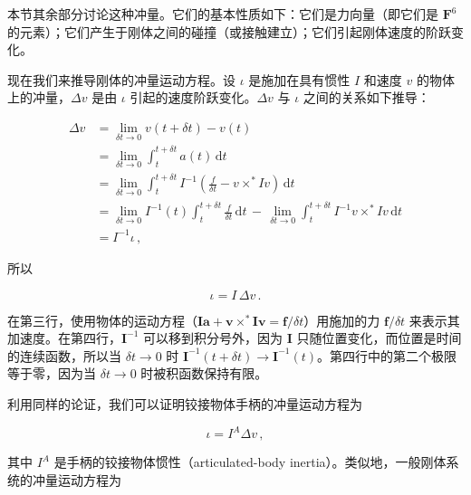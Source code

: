 \documentclass[10pt,a4paper]{book}
\theoremstyle{thmstyle} %
\theoremstyle{defstyle} %
\theoremstyle{prostyle} %
\begin{document}
本节其余部分讨论这种冲量。它们的基本性质如下：它们是力向量（即它们是 $\mathbf{F}^{6}$ 的元素）；它们产生于刚体之间的碰撞（或接触建立）；它们引起刚体速度的阶跃变化。



现在我们来推导刚体的冲量运动方程。设 $\iota$ 是施加在具有惯性 $I$ 和速度 $v$ 的物体上的冲量，$\Delta v$ 是由 $\iota$ 引起的速度阶跃变化。$\Delta v$ 与 $\iota$ 之间的关系如下推导：



$$
\begin{array}{rl} { \Delta v } & { = \operatorname* { l i m } _ { \delta t \to 0 } v ( t + \delta t ) - v ( t ) } \\& { = \operatorname* { l i m } _ { \delta t \to 0 } \int _ { t } ^{t + \delta t} a ( t ) \, \mathrm { d } t } \\& { = \operatorname* { l i m } _ { \delta t \to 0 } \int _ { t } ^{t + \delta t} I ^{- 1} ( \frac { f } { \delta t } - v \times ^{*} I v ) \, \mathrm { d } t } \\& { = \operatorname* { l i m } _ { \delta t \to 0 } I ^{- 1} ( t ) \int _ { t } ^{t + \delta t} \frac { f } { \delta t } \, \mathrm { d } t \, - \, \operatorname* { l i m } _ { \delta t \to 0 } \int _ { t } ^{t + \delta t} I ^{- 1} v \times ^{*} I v \, \mathrm { d } t } \\& { = I ^{- 1} \iota \, , } \end{array}
$$



所以



$$
\iota = I \, \Delta v \, .
$$



在第三行，使用物体的运动方程（$\boldsymbol{I}\boldsymbol{a}+\boldsymbol{v}\times^{*}\boldsymbol{I}\boldsymbol{v}=\boldsymbol{f}/\delta t$）用施加的力 $\boldsymbol{f}/\delta t$ 来表示其加速度。在第四行，$\boldsymbol{I}^{-1}$ 可以移到积分号外，因为 $\boldsymbol{I}$ 只随位置变化，而位置是时间的连续函数，所以当 $\delta t\rightarrow0$ 时 $\boldsymbol{I}^{-1}(t+\delta t)\rightarrow\boldsymbol{I}^{-1}(t)$。第四行中的第二个极限等于零，因为当 $\delta t\rightarrow0$ 时被积函数保持有限。



利用同样的论证，我们可以证明铰接物体手柄的冲量运动方程为



$$
\iota = I ^{A} \Delta v \, ,
$$



其中 $I^{A}$ 是手柄的铰接物体惯性（articulated-body inertia）。类似地，一般刚体系统的冲量运动方程为
\end{document}
